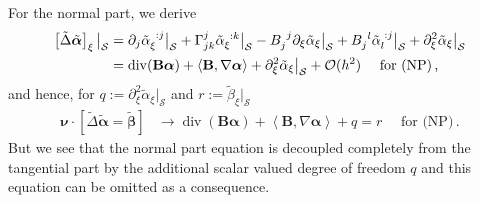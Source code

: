\documentclass[a4paper,10pt]{scrartcl}
\newcommand{\surf}{\mathcal{S}}
\newcommand{\landau}{\mathcal{O}}
\newcommand{\nub}{\bm{\nu}}
\newcommand{\Bb}{\mathbf{B}}
\newcommand{\alphab}{\bm{\alpha}}
\newcommand{\betab}{\bm{\beta}}
\renewcommand{\div}{\operatorname{div}}
\newcommand{\talphab}{\tilde{\alphab}}
\newcommand{\talpha}{\tilde{\alpha}}
\newcommand{\tbetab}{\tilde{\betab}}
\newcommand{\tbeta}{\tilde{\beta}}
\newcommand{\tlaplace}{\tilde{\Delta}}
\newcommand{\ch}[2]{\Gamma_{#1}^{#2}}
\newcommand{\formComma}{\,\text{,}}
\newcommand{\formPeriod}{\,\text{.}}
\begin{document}
      For the normal part, we derive
      \begin{align}
        \left[ \tlaplace\talphab \right]_{\xi}\big|_{\surf}
            &= \partial_{j}\tensor{\talpha}{_{\xi}^{:j}}\big|_{\surf} + \ch{jk}{j}\tensor{\talpha}{_{\xi}^{:k}}\big|_{\surf}
              - \tensor{B}{_{j}^{j}}\partial_{\xi}\talpha_{\xi}\big|_{\surf}
              +  \tensor{B}{_{j}^{l}}\tensor{\talpha}{_{l}^{:j}}\big|_{\surf} + \partial_{\xi}^{2}\talpha_{\xi}\big|_{\surf}\\
            &= \div(\Bb\alphab) + \left\langle \Bb,\nabla\alphab \right\rangle + \partial_{\xi}^{2}\talpha_{\xi}\big|_{\surf} + \landau(h^{2})
              \quad\text{ for (NP)}\formComma
      \end{align}
      and hence, for \( q:=\partial_{\xi}^{2}\talpha_{\xi}\big|_{\surf} \) and \( r:= \tbeta_{\xi}\big|_{\surf} \)
      \begin{align}
        \nub\cdot\left[\tlaplace\talphab = \tbetab  \right] &\longrightarrow
               \div(\Bb\alphab) + \left\langle \Bb,\nabla\alphab \right\rangle + q
                  =  r  \quad\text{ for (NP)}\formPeriod
      \end{align}
      But we see that the normal part equation is decoupled completely from the tangential part by the additional scalar valued degree of freedom \( q \)
      and this equation can be omitted as a consequence.



\end{document}
